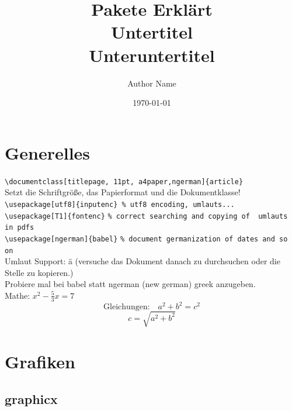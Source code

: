 \documentclass[notitlepage, 11pt, a4paper,ngerman]{article}
\begin{document}
\title{
	{\Huge Pakete Erklärt}\\[1em]
	{\huge Untertitel}\\[1em]
	{\Large Unteruntertitel}}
\author{Author Name}
\date{ \today}
\maketitle

\thispagestyle{empty}
\pagebreak
{}
\tableofcontents \thispagestyle{fancy}
\listoffigures \thispagestyle{fancy}
\listoftables \thispagestyle{fancy}
\pagebreak


\newpage

\section{Generelles}

\verb|\documentclass[titlepage, 11pt, a4paper,ngerman]{article}|\\
Setzt die Schriftgröße, das Papierformat und die Dokumentklasse!\\[10pt]
\verb|\usepackage[utf8]{inputenc} % utf8 encoding, umlauts...|\\
\verb|\usepackage[T1]{fontenc}| \texttt{\% correct searching and copying of \ um\-lauts in pdfs}\\
\verb|\usepackage[ngerman]{babel}| \texttt{\% document germanization of dates and so on}\\[10pt]
Umlaut Support: ä (versuche das Dokument danach zu durchsuchen oder die Stelle zu kopieren.)\\
Probiere mal bei babel statt ngerman (new german) greek anzugeben.\\[10pt]
Mathe: $ x^2 - \frac{5}{3}x = 7 $ \label{test}
\begin{equation}
\textrm{Gleichungen:} \quad a^2 + b^2 = c^2
\label{Pythagoras}
\end{equation}
\begin{equation}
c = \sqrt{a^2 + b^2}
\label{2}
\end{equation}

\section{Grafiken}

\subsection{graphicx}
\end{document}
